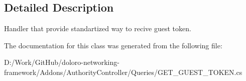 \subsection{Detailed Description}
Handler that provide standartized way to recive guest token. 



The documentation for this class was generated from the following file\+:\begin{DoxyCompactItemize}
\item 
D\+:/\+Work/\+Git\+Hub/doloro-\/networking-\/framework/\+Addons/\+Authority\+Controller/\+Queries/G\+E\+T\+\_\+\+G\+U\+E\+S\+T\+\_\+\+T\+O\+K\+E\+N.\+cs\end{DoxyCompactItemize}
